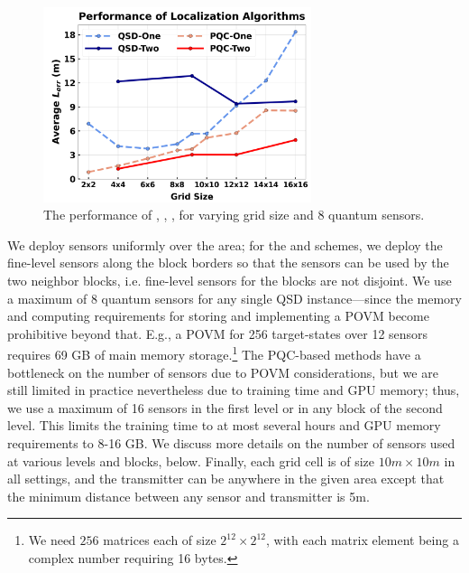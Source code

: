 \begin{figure}[t]
    \centering
    \includegraphics[width=0.7\textwidth]{chapters/qce/figures/continuous.varygrid.png}
    \caption{The performance of \povmone, \povm, \pqcone, \pqctwo for varying grid size and 8 quantum sensors.}
    \label{fig:continuous.varygrid}
\end{figure}

We deploy sensors uniformly over the area; for the \povm and  \pqctwo schemes, we deploy the fine-level sensors along the block borders so that the sensors can be used by the two neighbor blocks, i.e. fine-level sensors for the blocks are not disjoint.
We use a maximum of 8 quantum sensors for any single QSD instance---since the memory and computing requirements for storing and implementing a POVM become prohibitive beyond that. E.g., a POVM for 256 target-states over 12 sensors requires 69 GB of main memory storage.\footnote{We need $256$ matrices each of size $2^{12} \times 2^{12}$, with each matrix element being a complex number requiring 16 bytes.} 
The PQC-based methods have a bottleneck on the number of sensors due to POVM considerations, but 
we are still limited in practice nevertheless due to training time and GPU memory; thus, we 
use a maximum of 16 sensors in the first level or in any block of the second level. This limits
the training time to at most several hours and GPU memory requirements to 8-16 GB. 
We discuss more details on the number of sensors used at various levels and blocks, below.
Finally, each grid cell is of size $10m \times 10m$ in all settings, and the transmitter 
can be anywhere in the given area except that the minimum distance between any sensor
and transmitter is 5m.

